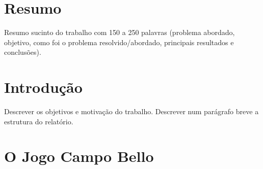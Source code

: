 \documentclass[a4paper]{article}
\begin{document}

\newpage

\section*{Resumo}
Resumo sucinto do trabalho com 150 a 250 palavras (problema abordado, objetivo, como foi o problema resolvido/abordado, principais resultados e conclusões).

\newpage

\tableofcontents



\newpage

\section{Introdução}

Descrever os objetivos e motivação do trabalho. Descrever num parágrafo breve a estrutura do relatório.


\section{O Jogo Campo Bello}
\end{document}
